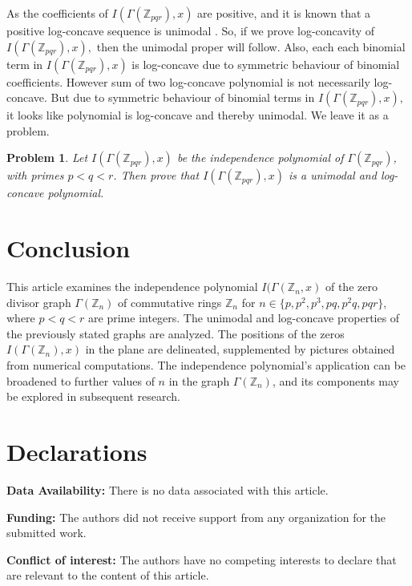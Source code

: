 \documentclass[12pt,twoside]{article}
\newtheorem{problem}{Problem}
\begin{document}
As the coefficients of $I(\varGamma(\mathbb{Z}_{pqr}),x)$ are positive, and it is known that a positive log-concave sequence is unimodal \cite{stanley}. So, if we prove log-concavity of $I(\varGamma(\mathbb{Z}_{pqr}),x),$ then the unimodal proper will follow. Also, each   each binomial term in $ I(\varGamma(\mathbb{Z}_{pqr}),x)$ is log-concave due to symmetric behaviour of binomial coefficients. However sum of two log-concave polynomial is not necessarily log-concave. But due to symmetric behaviour of binomial terms in $I(\varGamma(\mathbb{Z}_{pqr}),x),$ it looks like polynomial is log-concave and thereby unimodal. We leave it as a problem. 
\begin{problem}
	Let $I(\varGamma(\mathbb{Z}_{pqr}),x)$ be the independence polynomial of $\varGamma(\mathbb{Z}_{pqr})$, with primes $p<q<r$. Then prove that $I(\varGamma(\mathbb{Z}_{pqr}),x)$ is a unimodal and log-concave polynomial.
\end{problem}
\section{Conclusion}
This article examines the independence polynomial $I(\varGamma(\mathbb{Z}_{n},x)$ of the zero divisor graph $\varGamma(\mathbb{Z}_{n})$ of commutative rings $\mathbb{Z}_{n}$ for $n \in \{p,p^{2},p^{3},pq,p^{2}q,pqr\}$, where $p<q<r$ are prime integers. The unimodal and log-concave properties of the previously stated graphs are analyzed. The positions of the zeros $I(\varGamma(\mathbb{Z}_{n}),x)$ in the plane are delineated, supplemented by pictures obtained from numerical computations. The independence polynomial's application can be broadened to further values of $n$ in the graph $\varGamma(\mathbb{Z}_{n})$, and its components may be explored in subsequent research.






\section*{Declarations}
\noindent \textbf{Data Availability:}	There is no data associated with this article.

\noindent \textbf{Funding:} The authors did not receive support from any organization for the submitted work.

\noindent \textbf{Conflict of interest:} The authors have no competing interests to declare that are relevant to the content of this article. 
\end{document}
